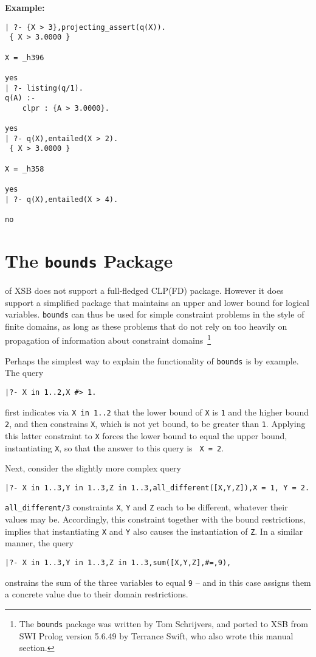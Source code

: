 \begin{description}
{\bf Example:}
{\small
\begin{verbatim}
| ?- {X > 3},projecting_assert(q(X)).
 { X > 3.0000 }

X = _h396

yes
| ?- listing(q/1).
q(A) :-
    clpr : {A > 3.0000}.

yes
| ?- q(X),entailed(X > 2).
 { X > 3.0000 }

X = _h358

yes
| ?- q(X),entailed(X > 4).

no
\end{verbatim}
}
\end{description}

\section{The {\tt bounds} Package} \label{sec:bounds}
%

\version{} of XSB does not support a full-fledged CLP(FD) package.
However it does support a simplified package that maintains an upper
and lower bound for logical variables.  {\tt bounds} can thus be used
for simple constraint problems in the style of finite domains, as long
as these problems that do not rely on too heavily on propagation of
information about constraint domains~\footnote{The {\tt bounds}
  package was written by Tom Schrijvers, and ported to XSB from SWI
  Prolog version 5.6.49 by Terrance Swift, who also wrote this manual
  section.}

Perhaps the simplest way to explain the functionality of {\tt bounds}
is by example.  The query
%
{\small
\begin{verbatim}
|?- X in 1..2,X #> 1.
\end{verbatim}
}
%
\noindent
first indicates via {\tt X in 1..2} that the lower bound of {\tt X} is
{\tt 1} and the higher bound {\tt 2}, and then constrains {\tt X},
which is not yet bound, to be greater than {\tt 1}.  Applying this
latter constraint to {\tt X} forces the lower bound to equal the upper
bound, instantiating {\tt X}, so that the answer to this query is {\tt
  X = 2}.

Next, consider the slightly more complex query
%
{\small
\begin{verbatim}
|?- X in 1..3,Y in 1..3,Z in 1..3,all_different([X,Y,Z]),X = 1, Y = 2.
\end{verbatim}
}
%
\noindent
{\tt all\_different/3} constraints {\tt X}, {\tt Y} and {\tt Z} each
to be different, whatever their values may be.  Accordingly, this
constraint together with the bound restrictions, implies that
instantiating {\tt X} and {\tt Y} also causes the instantiation of
{\tt Z}.  In a similar manner, the query
%
{\small
\begin{verbatim}
|?- X in 1..3,Y in 1..3,Z in 1..3,sum([X,Y,Z],#=,9),
\end{verbatim}
}
%
\noindent
onstrains the sum of the three variables to equal {\tt 9} -- and in
this case assigns them a concrete value due to their domain
restrictions.

